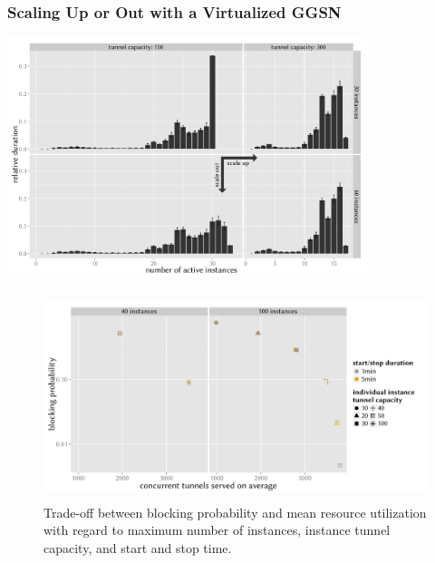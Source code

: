 \documentclass{beamer}
\begin{document}
\begin{frame}
	\frametitle{Scaling Up or Out with a Virtualized GGSN}
	
	\begin{center}
		\includegraphics[height=7cm]{../../chapters/041-mobilenetsmeasuring/images/R-virtualized-instanceuse-barplot.pdf}
	\end{center}
\end{frame}

\begin{frame}
	\begin{figure}
		\centering
		\includegraphics[height=6cm]{../../chapters/041-mobilenetsmeasuring/images/R-virtualized-startstop-tunnelusage-blocking-comparison.pdf}
		\caption{Trade-off between blocking probability and mean resource utilization with regard to maximum number of instances, instance tunnel capacity, and start and stop time.}
	\end{figure}
\end{frame}
\end{document}
